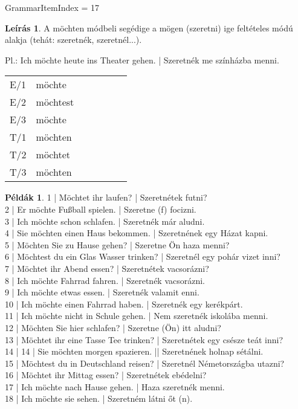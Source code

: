 \documentclass{article}
\theoremstyle{definition}
\newtheorem*{exmp}{Példák}
\newtheorem*{desc}{Leírás}
\begin{document}
GrammarItemIndex = 17

\begin{desc}
A möchten módbeli segédige a mögen (szeretni) ige feltételes módú
alakja (tehát: szeretnék, szeretnél...).

Pl.: Ich möchte heute ins Theater gehen. | Szeretnék me színházba menni.

\begin{tabular}{lllllll}
E/1 & möchte \\
E/2 & möchtest \\
E/3 & möchte \\
T/1 & möchten \\
T/2 & möchtet \\
T/3 & möchten \\
\end{tabular}
\end{desc}

\begin{exmp}	%
1 | Möchtet ihr laufen? | Szeretnétek futni?\\
2 | Er möchte Fußball spielen. | Szeretne (f) focizni.\\
3 | Ich möchte schon schlafen. | Szeretnék már aludni.\\
4 | Sie möchten einen Haus bekommen. | Szeretnének egy Házat kapni.\\
5 | Möchten Sie zu Hause gehen? | Szeretne Ön haza menni?\\
6 | Möchtest du ein Glas Wasser trinken? | Szeretnél egy pohár vizet inni?\\
7 | Möchtet ihr Abend essen? | Szeretnétek vacsorázni?\\
8 | Ich möchte Fahrrad fahren. | Szeretnék vacsorázni.\\
9 | Ich möchte etwas essen. | Szeretnék valamit enni.\\
10 | Ich möchte einen Fahrrad haben. | Szeretnék egy kerékpárt.\\
11 | Ich möchte nicht in Schule gehen. | Nem szeretnék iskolába menni.\\
12 | Möchten Sie hier schlafen? | Szeretne (Ön) itt aludni?\\
13 | Möchtet ihr eine Tasse Tee trinken? | Szeretnétek egy csésze teát inni?\\
14 | 14 | Sie möchten morgen spazieren. || Szeretnének holnap sétálni.\\
15 | Möchtest du in Deutschland reisen? | Szeretnél Németországba utazni?\\
16 | Möchtet ihr Mittag essen? | Szeretnétek ebédelni?\\
17 | Ich möchte nach Hause gehen. | Haza szeretnék menni.\\
18 | Ich möchte sie sehen. | Szeretném látni őt (n).\\
\end{exmp}
\end{document}

